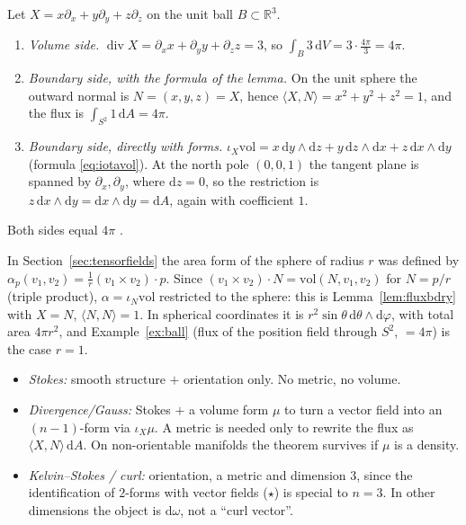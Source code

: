 \documentclass[11pt,a4paper]{article}
\numberwithin{equation}{section}
\theoremstyle{definition}
\theoremstyle{plain}
\newcommand{\R}{\mathbb{R}}
\newcommand{\dd}{\mathrm{d}}
\newcommand{\vol}{\mathrm{vol}}
\newcommand{\hodge}{\star}
\begin{document}
\begin{example}\label{ex:ball}
Let $X=x\partial_x+y\partial_y+z\partial_z$ on the unit ball $B\subset\R^3$.
\begin{enumerate}
\item \emph{Volume side.} $\operatorname{div}X=\partial_xx+\partial_yy+\partial_zz=3$, so $\int_B3\,\dd V=3\cdot\frac{4\pi}3=4\pi$.
\item \emph{Boundary side, with the formula of the lemma.} On the unit sphere the outward normal is $N=(x,y,z)=X$, hence $\langle X,N\rangle=x^2+y^2+z^2=1$, and the flux is $\int_{S^2}1\,\dd A=4\pi$.
\item \emph{Boundary side, directly with forms.} $\iota_X\vol=x\,\dd y\wedge\dd z+y\,\dd z\wedge\dd x+z\,\dd x\wedge\dd y$ (formula \eqref{eq:iotavol}). At the north pole $(0,0,1)$ the tangent plane is spanned by $\partial_x,\partial_y$, where $\dd z=0$, so the restriction is $z\,\dd x\wedge\dd y=\dd x\wedge\dd y=\dd A$, again with coefficient $1$.
\end{enumerate}
Both sides equal $4\pi$ \checkmark.
\end{example}

\begin{synthesis}\label{syn:sphere}
In Section~\ref{sec:tensorfields} the area form of the sphere of radius $r$ was defined by $\alpha_p(v_1,v_2)=\frac1r(v_1\times v_2)\cdot p$. Since $(v_1\times v_2)\cdot N=\vol(N,v_1,v_2)$ for $N=p/r$ (triple product),
$\alpha=\iota_N\vol$ restricted to the sphere: this is Lemma~\ref{lem:fluxbdry} with $X=N$, $\langle N,N\rangle=1$. In spherical coordinates it is $r^2\sin\theta\,\dd\theta\wedge\dd\varphi$, with total area $4\pi r^2$, and Example~\ref{ex:ball} (flux of the position field through $S^2$, $=4\pi$) is the case $r=1$.
\end{synthesis}

\begin{remark}\label{rem:whatneeds}
\begin{itemize}
\item \emph{Stokes:} smooth structure $+$ orientation only. No metric, no volume.
\item \emph{Divergence/Gauss:} Stokes $+$ a volume form $\mu$ to turn a vector field into an $(n-1)$-form via $\iota_X\mu$. A metric is needed only to rewrite the flux as $\langle X,N\rangle\,\dd A$. On non-orientable manifolds the theorem survives if $\mu$ is a density.
\item \emph{Kelvin--Stokes / curl:} orientation, a metric and dimension $3$, since the identification of $2$-forms with vector fields ($\hodge$) is special to $n=3$. In other dimensions the object is $\dd\omega$, not a ``curl vector''.
\end{itemize}
\end{remark}
\end{document}
